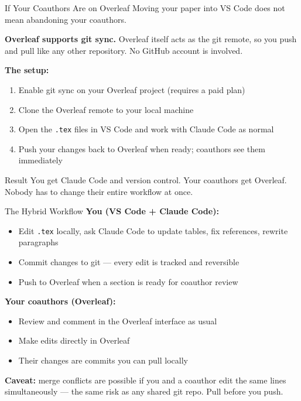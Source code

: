 \documentclass[aspectratio=169, 11pt]{beamer}
\begin{document}
\begin{frame}{If Your Coauthors Are on Overleaf}
  Moving your paper into VS Code does not mean abandoning your coauthors.

  \vspace{0.8em}
  \textbf{Overleaf supports git sync.} Overleaf itself acts as the git remote, so you push and pull like any other repository. No GitHub account is involved.

  \vspace{0.8em}
  \textbf{The setup:}
  \begin{enumerate}
    \item Enable git sync on your Overleaf project (requires a paid plan)
    \item Clone the Overleaf remote to your local machine
    \item Open the \texttt{.tex} files in VS Code and work with Claude Code as normal
    \item Push your changes back to Overleaf when ready; coauthors see them immediately
  \end{enumerate}

  \vspace{0.8em}
  \begin{block}{Result}
    You get Claude Code and version control. Your coauthors get Overleaf.\\
    Nobody has to change their entire workflow at once.
  \end{block}
\end{frame}

\begin{frame}{The Hybrid Workflow}
  \textbf{You (VS Code + Claude Code):}
  \begin{itemize}
    \item Edit \texttt{.tex} locally, ask Claude Code to update tables, fix references, rewrite paragraphs
    \item Commit changes to git --- every edit is tracked and reversible
    \item Push to Overleaf when a section is ready for coauthor review
  \end{itemize}

  \vspace{0.8em}
  \textbf{Your coauthors (Overleaf):}
  \begin{itemize}
    \item Review and comment in the Overleaf interface as usual
    \item Make edits directly in Overleaf
    \item Their changes are commits you can pull locally
  \end{itemize}

  \vspace{0.8em}
  \textbf{Caveat:} merge conflicts are possible if you and a coauthor edit the same lines simultaneously --- the same risk as any shared git repo. Pull before you push.
  \vfill
  \hyperlink{backmatter}{}
\end{frame}
\end{document}
